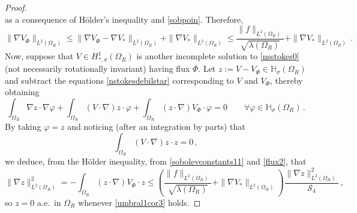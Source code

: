 \documentclass[10pt,a4paper]{amsart}
\begin{document}
\begin{proof}
$$$$
as a consequence of H\"older's inequality and \eqref{sobpoin}. Therefore,
\begin{equation} \label{flux2}
\| \nabla V_{\Phi} \|_{L^{2}(\Omega_{R})} \leq \| \nabla V_{\Phi} - \nabla V_{*} \|_{L^{2}(\Omega_{R})} + \| \nabla V_{*} \|_{L^{2}(\Omega_{R})}
\leq \dfrac{\|f\|_{L^2(\Omega_{R})}}{\sqrt{\lambda(\Omega_{R})}} + \| \nabla V_{*} \|_{L^{2}(\Omega_{R})} \, .
\end{equation}
Now, suppose that $V \in H^{1}_{*,\sigma}(\Omega_{R})$ is another incomplete solution to  \eqref{nsstokes0} (not necessarily rotationally
invariant) having flux $\Phi$. Let $z := V - V_{\Phi} \in \mathbb{H}_{\sigma}(\Omega_{R})$ and subtract the equations
\eqref{nstokesdebilstar} corresponding to $V$ and $V_{\Phi}$, thereby obtaining
$$
\int_{\Omega_{R}} \nabla z \cdot \nabla \varphi + \int_{\Omega_{R}} (V \cdot \nabla) z \cdot \varphi + \int_{\Omega_{R}} (z \cdot \nabla) V_{\Phi}
\cdot \varphi = 0 \qquad \forall \varphi \in \mathbb{H}_{\sigma}(\Omega_{R}) \, .
$$
By taking $\varphi=z$ and noticing (after an integration by parts) that
$$
\int_{\Omega_{R}} (V \cdot \nabla) z \cdot z = 0 \, ,
$$
we deduce, from the H\"older inequality, from \eqref{sobolevconstants11} and \eqref{flux2}, that
$$
\|\nabla z\|^2_{L^2(\Omega_{R})} = - \int_{\Omega_{R}} (z \cdot \nabla)  V_{\Phi} \cdot z \leq \left(
\dfrac{\|f\|_{L^2(\Omega_{R})}}{\sqrt{\lambda(\Omega_{R})}} + \| \nabla V_{*} \|_{L^{2}(\Omega_{R})} \right) \frac{\|\nabla
z\|^2_{L^2(\Omega_{R})}}{\mathcal{S}_4}  \, ,
$$
so $z = 0$ a.e.\ in $\Omega_{R}$ whenever \eqref{umbral1cor3} holds.
\end{proof}
\end{document}
